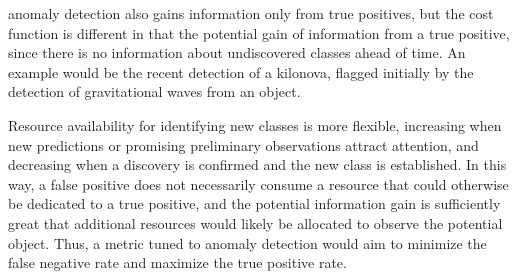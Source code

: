 \label{sec:anom}
 anomaly detection also gains information only from true positives, but the cost function is different in that the potential gain of information from a true positive, since there is no information about undiscovered classes ahead of time.
An example would be the recent detection of a kilonova, flagged initially by the detection of gravitational waves from an object.

Resource availability for identifying new classes is more flexible, increasing when new predictions or promising preliminary observations attract attention, and decreasing when a discovery is confirmed and the new class is established.
In this way, a false positive does not necessarily consume a resource that could otherwise be dedicated to a true positive, and the potential information gain is sufficiently great that additional resources would likely be allocated to observe the potential object.
Thus, a metric tuned to anomaly detection would aim to minimize the false negative rate and maximize the true positive rate.

%

